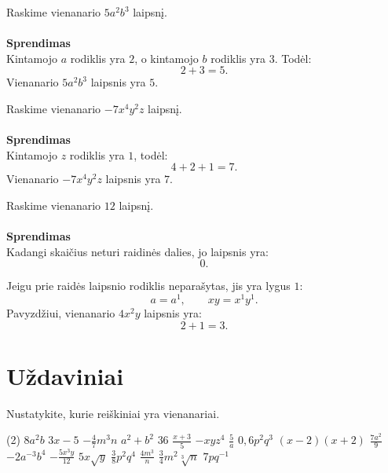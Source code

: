 \documentclass[11pt,a4paper]{scrartcl}
\begin{document}
\begin{example}
Raskime vienanario $5a^2b^3$ laipsnį.\\ \\
\textbf{Sprendimas}\\
Kintamojo $a$ rodiklis yra $2$, o kintamojo $b$ rodiklis yra $3$. Todėl:
\[
2+3=5.
\]
Vienanario $5a^2b^3$ laipsnis yra $5$.
\end{example}

\begin{example}
Raskime vienanario $-7x^4y^2z$ laipsnį.\\ \\
\textbf{Sprendimas}\\
Kintamojo $z$ rodiklis yra $1$, todėl:
\[
4+2+1=7.
\]
Vienanario $-7x^4y^2z$ laipsnis yra $7$.
\end{example}

\begin{example}
Raskime vienanario $12$ laipsnį. \\ \\
\textbf{Sprendimas}\\ 
Kadangi skaičius neturi raidinės dalies, jo laipsnis yra:
\[
0.
\]
\end{example}

\begin{remark}
Jeigu prie raidės laipsnio rodiklis neparašytas, jis yra lygus $1$:
\[
a=a^1, \qquad xy=x^1y^1.
\]
Pavyzdžiui, vienanario $4x^2y$ laipsnis yra:
\[
2+1=3.
\]
\end{remark}
\newpage
\section{Uždaviniai}

\begin{problem}
Nustatykite, kurie reiškiniai yra vienanariai.

\begin{tasks}[label={(\arabic*)}, label-offset=0.9em](2)
    \task $8a^2b$
    \task $3x-5$
    \task $-\frac{4}{7}m^3n$
    \task $a^2+b^2$
    \task $36$
    \task $\frac{x+3}{5}$
    \task $-xyz^4$
    \task $\frac{5}{a}$
    \task $0,6p^2q^3$
    \task $(x-2)(x+2)$
    \task $\frac{7a^2}{9}$
    \task $-2a^{-3}b^4$
    \task $-\frac{5x^3y}{12}$
    \task $5x\sqrt{y}$
    \task $\frac{3}{8}p^2q^4$
    \task $\frac{4m^3}{n}$
    \task $\frac{3}{4}m^2\sqrt[3]{n}$
    \task $7pq^{-1}$
\end{tasks}
\end{problem}
\end{document}
